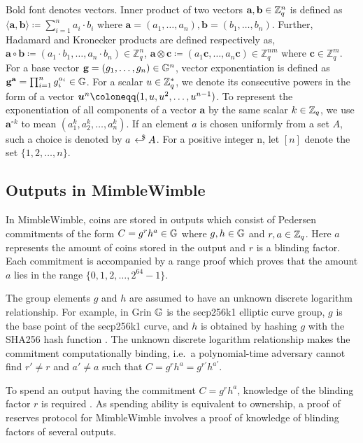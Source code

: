 Bold font denotes vectors.
Inner product of two vectors $\textbf{a}, \textbf{b} \in \mathbb{Z}_q^n$ is defined as $\langle \textbf{a},\textbf{b} \rangle \coloneqq \sum_{i=1}^{n} a_i \cdot b_i$ where $\textbf{a}=(a_1,\dots, a_n), \textbf{b}=(b_1,\dots,b_n)$. Further, Hadamard and Kronecker products are defined respectively as, $\textbf{a} \circ \textbf{b} \coloneqq (a_1 \cdot b_1, \dots, a_n \cdot b_n) \in \mathbb{Z}_q^n$, $\textbf{a} \otimes \textbf{c} \coloneqq (a_1 \textbf{c}, \dots, a_n \textbf{c}) \in \mathbb{Z}_q^{nm}$ where $\textbf{c} \in \mathbb{Z}_q^m$. For a base vector $\textbf{g} = (g_1, \dots, g_n) \in \mathbb{G}^n$, vector exponentiation is defined as $\textbf{g}^{\textbf{a}} = \prod_{i=1}^{n}g_i^{a_i} \in \mathbb{G}$. For a scalar $u \in \mathbb{Z}_q^{\ast}$, we denote its consecutive powers in the form of a vector $\vecnb{u}^{n} \coloneqq (1, u, u^2, \dots, u^{n-1})$.
To represent the exponentiation of all components of a vector $\textbf{a}$ by the same scalar $k \in \mathbb{Z}_q$, we use $\textbf{a}^{\circ k}$ to mean $(a_1^k, a_2^k, \ldots,a_n^{k})$.
If an element $a$ is chosen uniformly from a set $A$, such a choice is denoted by $a \rgen A$.
For a positive integer n, let $[n]$ denote the set $\{1,2,\dots,n\}$.

\subsection{Outputs in MimbleWimble}

In MimbleWimble, coins are stored in outputs which consist of Pedersen commitments of the form $C = g^rh^a\in \mathbb{G}$ where $g , h \in \mathbb{G}$ and $r,a \in \mathbb{Z}_q$. Here $a$ represents the amount of coins stored in the output and $r$ is a blinding factor. Each commitment is accompanied by a range proof which proves that the amount $a$ lies in the range $\{0,1,2,\ldots,2^{64}-1\}$.

The group elements $g$ and $h$ are assumed to have an unknown discrete logarithm relationship. For example, in Grin $\mathbb{G}$ is the secp256k1 elliptic curve group, $g$ is the base point of the secp256k1 curve, and $h$ is obtained by hashing $g$ with the SHA256 hash function \cite{RustSecp256k1Constants}. The unknown discrete logarithm relationship makes the commitment computationally binding, i.e.~a polynomial-time adversary cannot find $r' \neq r$ and $a' \neq a$ such that $C = g^rh^a = g^{r'}h^{a'}$.

To spend an output having the commitment $C = g^r h^a$, knowledge of the blinding factor $r$ is required \cite{GrinDocOnGithub}. As spending ability is equivalent to ownership, a proof of reserves protocol for MimbleWimble involves a proof of knowledge of blinding factors of several outputs.

